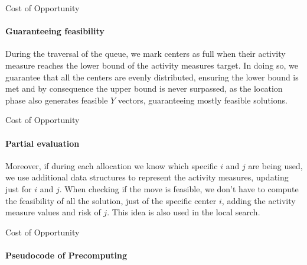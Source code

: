 \documentclass{beamer}
\begin{document}
\begin{frame}{Cost of Opportunity}
    \framesubtitle{Guaranteeing feasibility}
        During the traversal of the queue, we mark centers as full when their activity measure reaches the lower bound of the activity measures target. In doing so, we guarantee that all the centers are evenly distributed, ensuring the lower bound is met and by consequence the upper bound is never surpassed, as the location phase also generates feasible $Y$ vectors, guaranteeing mostly feasible solutions.
\end{frame}

\begin{frame}{Cost of Opportunity}
    \framesubtitle{Partial evaluation}
    Moreover, if during each allocation we know which specific $i$ and $j$ are being used, we use additional data structures to represent the activity measures, updating just for $i$ and $j$. When checking if the move is feasible, we don't have to compute the feasibility of all the solution, just of the specific center $i$, adding the activity measure values and risk of $j$. This idea is also used in the local search.
\end{frame}

\begin{frame}{Cost of Opportunity}
    \framesubtitle{Pseudocode of Precomputing}
\end{frame}
\end{document}
